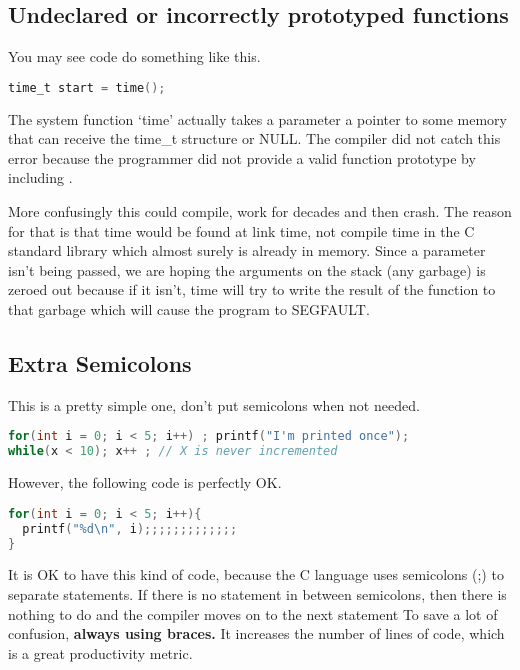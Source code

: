 \subsection{Undeclared or incorrectly prototyped functions}

You may see code do something like this.

\begin{lstlisting}[language=C]
time_t start = time();
\end{lstlisting}

The system function `time' actually takes a parameter a pointer to some memory that can receive the time\_t structure or NULL.
The compiler did not catch this error because the programmer did not provide a valid function prototype by including .

More confusingly this could compile, work for decades and then crash.
The reason for that is that time would be found at link time, not compile time in the C standard library which almost surely is already in memory.
Since a parameter isn't being passed, we are hoping the arguments on the stack (any garbage) is zeroed out because if it isn't, time will try to write the result of the function to that garbage which will cause the program to SEGFAULT.

\subsection{Extra Semicolons}

This is a pretty simple one, don't put semicolons when not needed.

\begin{lstlisting}[language=C]
for(int i = 0; i < 5; i++) ; printf("I'm printed once");
while(x < 10); x++ ; // X is never incremented
\end{lstlisting}

However, the following code is perfectly OK.

\begin{lstlisting}[language=C]
for(int i = 0; i < 5; i++){
  printf("%d\n", i);;;;;;;;;;;;;
}
\end{lstlisting}

It is OK to have this kind of code, because the C language uses semicolons (;) to separate statements.
If there is no statement in between semicolons, then there is nothing to do and the compiler moves on to the next statement
To save a lot of confusion, \textbf{always using braces.}
It increases the number of lines of code, which is a great productivity metric.



